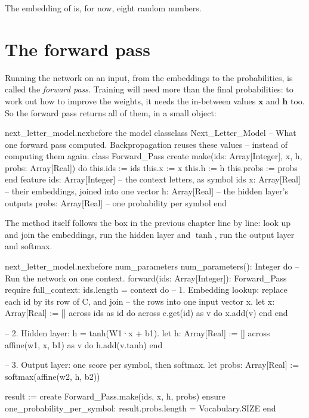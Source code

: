 \documentclass[11pt,a4paper,oneside,openany]{book}
\newcommand{\code}[1]{\texttt{\detokenize{#1}}}
\newcommand{\vect}[1]{\mathbf{#1}}
\begin{document}
The embedding of \code{a} is, for now, eight random numbers.

\chapter{The forward pass}

Running the network on an input, from the embeddings to the probabilities,
is called the \emph{forward pass}. Training will need more than the final
probabilities: to work out how to improve the weights, it needs the
in-between values $\vect{x}$ and $\vect{h}$ too. So the forward pass
returns all of them, in a small object:

\begin{addbefore}{next_letter_model.nex}{before the model class}{class Next_Letter_Model}
-- What one forward pass computed. Backpropagation reuses these values
-- instead of computing them again.
class Forward_Pass
create
  make(ids: Array[Integer], x, h, probs: Array[Real]) do
    this.ids := ids
    this.x := x
    this.h := h
    this.probs := probs
  end
feature
  ids: Array[Integer]   -- the context letters, as symbol ids
  x: Array[Real]        -- their embeddings, joined into one vector
  h: Array[Real]        -- the hidden layer's outputs
  probs: Array[Real]    -- one probability per symbol
end
\end{addbefore}

The method itself follows the box in the previous chapter line by line:
look up and join the embeddings, run the hidden layer and $\tanh$, run the
output layer and softmax.

\begin{addbefore}{next_letter_model.nex}{before num_parameters}{  num_parameters(): Integer do}
  -- Run the network on one context.
  forward(ids: Array[Integer]): Forward_Pass
  require
    full_context: ids.length = context
  do
    -- 1. Embedding lookup: replace each id by its row of C, and join
    --    the rows into one input vector x.
    let x: Array[Real] := []
    across ids as id do
      across c.get(id) as v do
        x.add(v)
      end
    end

    -- 2. Hidden layer: h = tanh(W1·x + b1).
    let h: Array[Real] := []
    across affine(w1, x, b1) as v do
      h.add(v.tanh)
    end

    -- 3. Output layer: one score per symbol, then softmax.
    let probs: Array[Real] := softmax(affine(w2, h, b2))

    result := create Forward_Pass.make(ids, x, h, probs)
  ensure
    one_probability_per_symbol: result.probs.length = Vocabulary.SIZE
  end
\end{addbefore}
\end{document}
